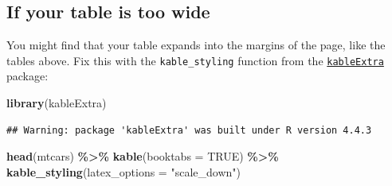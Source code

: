 \documentclass[a4paper, nobind]{templates/ociamthesis}
\newenvironment{Shaded}{\begin{snugshade}}{\end{snugshade}}
\newcommand{\AttributeTok}[1]{\textcolor[rgb]{0.13,0.29,0.53}{#1}}
\newcommand{\ConstantTok}[1]{\textcolor[rgb]{0.56,0.35,0.01}{#1}}
\newcommand{\FunctionTok}[1]{\textcolor[rgb]{0.13,0.29,0.53}{\textbf{#1}}}
\newcommand{\NormalTok}[1]{#1}
\newcommand{\SpecialCharTok}[1]{\textcolor[rgb]{0.81,0.36,0.00}{\textbf{#1}}}
\newcommand{\StringTok}[1]{\textcolor[rgb]{0.31,0.60,0.02}{#1}}
\renewenvironment{Shaded}
{
  \vspace{10pt}%
  \begin{snugshade}%
}{%
  \end{snugshade}%
  \vspace{8pt}%
}
\begin{document}
\subsection{If your table is too wide}\label{if-your-table-is-too-wide}

You might find that your table expands into the margins of the page, like the tables above.
Fix this with the \texttt{kable\_styling} function from the \href{https://haozhu233.github.io/kableExtra/}{\texttt{kableExtra}} package:

\begin{Shaded}
\begin{Highlighting}[]
\FunctionTok{library}\NormalTok{(kableExtra)}
\end{Highlighting}
\end{Shaded}

\begin{verbatim}
## Warning: package 'kableExtra' was built under R version 4.4.3
\end{verbatim}

\begin{Shaded}
\begin{Highlighting}[]
\FunctionTok{head}\NormalTok{(mtcars) }\SpecialCharTok{\%\textgreater{}\%} 
  \FunctionTok{kable}\NormalTok{(}\AttributeTok{booktabs =} \ConstantTok{TRUE}\NormalTok{) }\SpecialCharTok{\%\textgreater{}\%} 
  \FunctionTok{kable\_styling}\NormalTok{(}\AttributeTok{latex\_options =} \StringTok{"scale\_down"}\NormalTok{)}
\end{Highlighting}
\end{Shaded}

\begin{table}
\centering
{}
\end{table}
\end{document}
